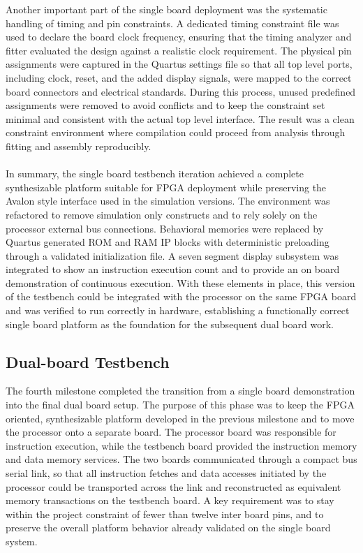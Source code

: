 \documentclass[12pt]{article}
\begin{document}
Another important part of the single board deployment was the systematic handling of timing and pin constraints. A dedicated timing constraint file was used to declare the board clock frequency, ensuring that the timing analyzer and fitter evaluated the design against a realistic clock requirement. The physical pin assignments were captured in the Quartus settings file so that all top level ports, including clock, reset, and the added display signals, were mapped to the correct board connectors and electrical standards. During this process, unused predefined assignments were removed to avoid conflicts and to keep the constraint set minimal and consistent with the actual top level interface. The result was a clean constraint environment where compilation could proceed from analysis through fitting and assembly reproducibly.
\\
\\
In summary, the single board testbench iteration achieved a complete synthesizable platform suitable for FPGA deployment while preserving the Avalon style interface used in the simulation versions. The environment was refactored to remove simulation only constructs and to rely solely on the processor external bus connections. Behavioral memories were replaced by Quartus generated ROM and RAM IP blocks with deterministic preloading through a validated initialization file. A seven segment display subsystem was integrated to show an instruction execution count and to provide an on board demonstration of continuous execution. With these elements in place, this version of the testbench could be integrated with the processor on the same FPGA board and was verified to run correctly in hardware, establishing a functionally correct single board platform as the foundation for the subsequent dual board work.


\subsection{Dual-board Testbench}

The fourth milestone completed the transition from a single board demonstration into the final dual board setup. The purpose of this phase was to keep the FPGA oriented, synthesizable platform developed in the previous milestone and to move the processor onto a separate board. The processor board was responsible for instruction execution, while the testbench board provided the instruction memory and data memory services. The two boards communicated through a compact bus serial link, so that all instruction fetches and data accesses initiated by the processor could be transported across the link and reconstructed as equivalent memory transactions on the testbench board. A key requirement was to stay within the project constraint of fewer than twelve inter board pins, and to preserve the overall platform behavior already validated on the single board system.
\end{document}
